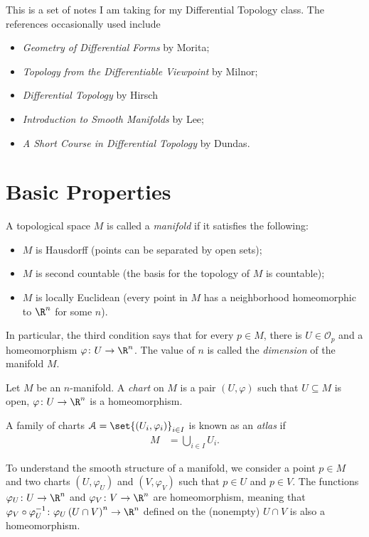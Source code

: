 \documentclass[10pt]{mypackage}
\begin{document}
\RaggedRight
This is a set of notes I am taking for my Differential Topology class. The references occasionally used include
\begin{itemize}
  \item \textit{Geometry of Differential Forms} by Morita;
  \item \textit{Topology from the Differentiable Viewpoint} by Milnor;
  \item \textit{Differential Topology} by Hirsch
  \item \textit{Introduction to Smooth Manifolds} by Lee;
  \item \textit{A Short Course in Differential Topology} by Dundas.
\end{itemize}
\tableofcontents
\section{Basic Properties}%
\begin{definition}
  A topological space $M$ is called a \textit{manifold} if it satisfies the following:
  \begin{itemize}
    \item $M$ is Hausdorff (points can be separated by open sets);
    \item $M$ is second countable (the basis for the topology of $M$ is countable);
    \item $M$ is locally Euclidean (every point in $M$ has a neighborhood homeomorphic to $\R^n$ for some $n$).
  \end{itemize}
  In particular, the third condition says that for every $p\in M$, there is $U\in \mathcal{O}_p$ and a homeomorphism $\varphi\colon U\rightarrow \R^n$. The value of $n$ is called the \textit{dimension} of the manifold $M$.
\end{definition}
\begin{definition}
  Let $M$ be an $n$-manifold. A \textit{chart} on $M$ is a pair $\left( U,\varphi \right)$ such that $U\subseteq M$ is open, $\varphi\colon U\rightarrow \R^n$ is a homeomorphism.\newline

  A family of charts $\mathcal{A} = \set{\left( U_i,\varphi_i \right)}_{i\in I}$ is known as an \textit{atlas} if
  \begin{align*}
    M &= \bigcup_{i\in I} U_i.
  \end{align*}
\end{definition}
To understand the smooth structure of a manifold, we consider a point $p\in M$ and two charts $\left( U,\varphi_U \right)$ and $\left( V,\varphi_V \right)$ such that $p\in U$ and $p\in V$. The functions $\varphi_U\colon U\rightarrow \R^n$ and $\varphi_V\colon V\rightarrow \R^n$ are homeomorphism, meaning that $\varphi_V\circ\varphi_U^{-1}\colon \varphi_{U}\left( U\cap V \right)^n\rightarrow \R^n$ defined on the (nonempty) $U\cap V$ is also a homeomorphism.\newline
\end{document}
